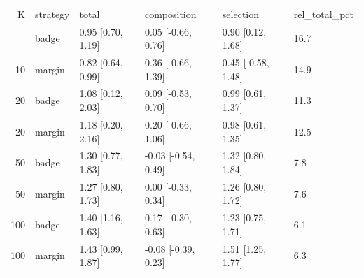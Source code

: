 \begin{tabular}{rlllll}
\toprule
K & strategy & total & composition & selection & rel_total_pct \\
\midrulece
10 & badge & 0.95 [0.70, 1.19] & 0.05 [-0.66, 0.76] & 0.90 [0.12, 1.68] & 16.7 \\
10 & margin & 0.82 [0.64, 0.99] & 0.36 [-0.66, 1.39] & 0.45 [-0.58, 1.48] & 14.9 \\
20 & badge & 1.08 [0.12, 2.03] & 0.09 [-0.53, 0.70] & 0.99 [0.61, 1.37] & 11.3 \\
20 & margin & 1.18 [0.20, 2.16] & 0.20 [-0.66, 1.06] & 0.98 [0.61, 1.35] & 12.5 \\
50 & badge & 1.30 [0.77, 1.83] & -0.03 [-0.54, 0.49] & 1.32 [0.80, 1.84] & 7.8 \\
50 & margin & 1.27 [0.80, 1.73] & 0.00 [-0.33, 0.34] & 1.26 [0.80, 1.72] & 7.6 \\
100 & badge & 1.40 [1.16, 1.63] & 0.17 [-0.30, 0.63] & 1.23 [0.75, 1.71] & 6.1 \\
100 & margin & 1.43 [0.99, 1.87] & -0.08 [-0.39, 0.23] & 1.51 [1.25, 1.77] & 6.3 \\
\bottomrule
\end{tabular}
